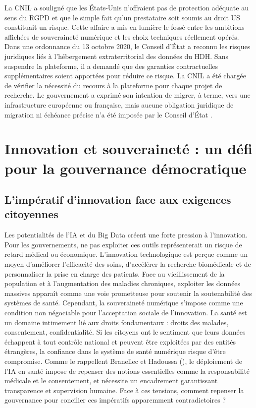 \documentclass[10pt,a4paper]{article}
\begin{document}
La CNIL a souligné que les États-Unis n'offraient pas de protection adéquate au sens du RGPD et que le simple fait qu'un prestataire soit soumis au droit US constituait un risque. Cette affaire a mis en lumière le fossé entre les ambitions affichées de souveraineté numérique et les choix techniques réellement opérés. Dans une ordonnance du 13 octobre 2020, le Conseil d’État a reconnu les risques juridiques liés à l’hébergement extraterritorial des données du HDH. Sans suspendre la plateforme, il a demandé que des garanties contractuelles supplémentaires soient apportées pour réduire ce risque. La CNIL a été chargée de vérifier la nécessité du recours à la plateforme pour chaque projet de recherche. Le gouvernement a exprimé son intention de migrer, à terme, vers une infrastructure européenne ou française, mais aucune obligation juridique de migration ni échéance précise n’a été imposée par le Conseil d’État \parencite{CNIL2020HDH}.

\section{Innovation et souveraineté : un défi pour la gouvernance démocratique}

\subsection{L'impératif d'innovation face aux exigences citoyennes}

Les potentialités de l'IA et du Big Data créent une forte pression à l'innovation. Pour les gouvernements, ne pas exploiter ces outils représenterait un risque de retard médical ou économique. L'innovation technologique est perçue comme un moyen d'améliorer l'efficacité des soins, d'accélérer la recherche biomédicale et de personnaliser la prise en charge des patients. Face au vieillissement de la population et à l'augmentation des maladies chroniques, exploiter les données massives apparaît comme une voie prometteuse pour soutenir la soutenabilité des systèmes de santé. Cependant, la souveraineté numérique s'impose comme une condition non négociable pour l'acceptation sociale de l'innovation. La santé est un domaine intimement lié aux droits fondamentaux : droits des malades, consentement, confidentialité. Si les citoyens ont le sentiment que leurs données échappent à tout contrôle national et peuvent être exploitées par des entités étrangères, la confiance dans le système de santé numérique risque d'être compromise. Comme le rappellent Branellec et Hadoussa (\citeyear{branellec2020intelligence}), le déploiement de l’IA en santé impose de repenser des notions essentielles comme la responsabilité médicale et le consentement, et nécessite un encadrement garantissant transparence et supervision humaine. Face à ces tensions, comment repenser la gouvernance pour concilier ces impératifs apparemment contradictoires ?
\end{document}
